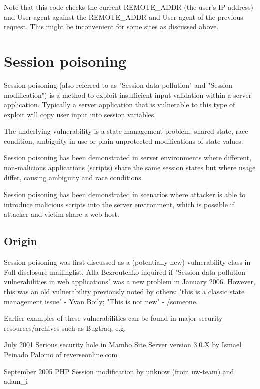 Note that this code checks the current REMOTE\_ADDR (the user's IP address) and User-agent against the REMOTE\_ADDR and User-agent of the previous request. This might be inconvenient for some sites as discussed above.













\chapter{Session poisoning}

Session poisoning (also referred to as "Session data pollution" and "Session modification") is a method to exploit insufficient input validation within a server application. Typically a server application that is vulnerable to this type of exploit will copy user input into session variables.

The underlying vulnerability is a state management problem: shared state, race condition, ambiguity in use or plain unprotected modifications of state values.

Session poisoning has been demonstrated in server environments where different, non-malicious applications (scripts) share the same session states but where usage differ, causing ambiguity and race conditions.

Session poisoning has been demonstrated in scenarios where attacker is able to introduce malicious scripts into the server environment, which is possible if attacker and victim share a web host.


\section{Origin}


Session poisoning was first discussed as a (potentially new) vulnerability class in Full disclosure mailinglist. Alla Bezroutchko inquired if "Session data pollution vulnerabilities in web applications" was a new problem in January 2006. However, this was an old vulnerability previously noted by others: "this is a classic state management issue" - Yvan Boily; "This is not new" - /someone.

Earlier examples of these vulnerabilities can be found in major security resources/archives such as Bugtraq, e.g.

\begin{compactitem}
\item July 2001 Serious security hole in Mambo Site Server version 3.0.X by Ismael Peinado Palomo of reverseonline.com
\item September 2005 PHP Session modification by unknow (from uw-team) and adam\_i
\end{compactitem}

